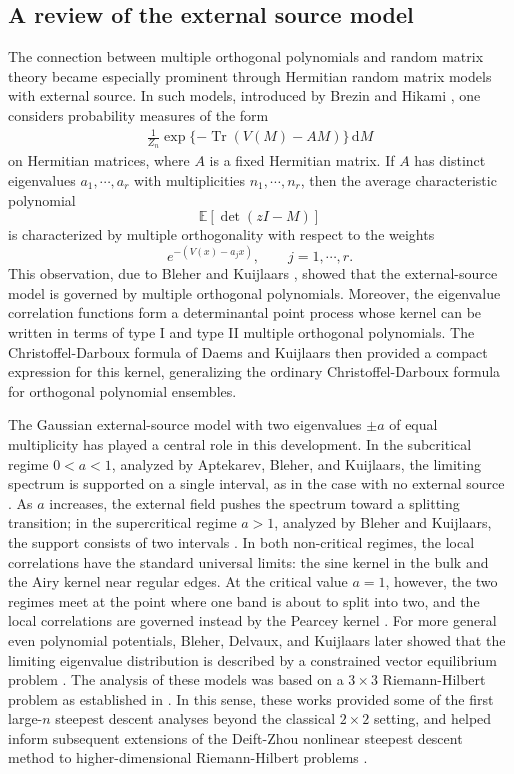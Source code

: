\documentclass[a4paper,10pt,leqno]{amsart}
\numberwithin{equation}{section}
\theoremstyle{remark}
\newcommand{\dd}{\mathrm{d}}
\begin{document}
\subsection{A review of the external source model}

The connection between multiple orthogonal polynomials and random matrix theory
became especially prominent through Hermitian random matrix models with external
source.  In such models, introduced by Brezin and Hikami \cite{BreHi1, BreHi2}, one considers probability measures of the form
\begin{align} \label{prob distribution}
    \frac{1}{Z_n}\exp\{-\operatorname{Tr}(V(M)-AM)\}\,\dd M
\end{align}
on Hermitian matrices, where $A$ is a fixed Hermitian matrix.  If $A$ has
distinct eigenvalues $a_1,\cdots,a_r$ with multiplicities
$n_1,\cdots,n_r$, then the average characteristic polynomial
\[
        \mathbb E[\det(zI-M)]
\]
is characterized by multiple orthogonality with respect to the weights
\[
        e^{-(V(x)-a_jx)}, \qquad j=1,\cdots,r.
\]
This observation, due to Bleher and Kuijlaars \cite{BK0}, showed that the
external-source model is governed by multiple orthogonal polynomials. Moreover,
the eigenvalue correlation functions form a determinantal point process whose
kernel can be written in terms of type I and type II multiple orthogonal
polynomials.  The Christoffel-Darboux formula of Daems and Kuijlaars
\cite{DaemsKuijlaars2004} then provided a compact expression for this kernel, generalizing the
ordinary Christoffel-Darboux formula for orthogonal polynomial ensembles.

The Gaussian external-source model with two eigenvalues $\pm a$ of equal
multiplicity has played a central role in this development.  In the
subcritical regime $0<a<1$, analyzed by Aptekarev, Bleher, and Kuijlaars,
the limiting spectrum is supported on a single interval, as in the case with
no external source \cite{ABK05}.  As $a$ increases, the external field pushes the spectrum
toward a splitting transition; in the supercritical regime $a>1$, analyzed by
Bleher and Kuijlaars, the support consists of two intervals
\cite{BK04b}.  In both non-critical regimes, the local correlations have
the standard universal limits: the sine kernel in the bulk and the Airy kernel
near regular edges.  At the critical value $a=1$, however, the two regimes
meet at the point where one band is about to split into two, and the local
correlations are governed instead by the Pearcey kernel \cite{BK07}.  For more general even polynomial
potentials, Bleher, Delvaux, and Kuijlaars later showed that the limiting
eigenvalue distribution is described by a constrained vector equilibrium
problem \cite{BDK11}.  The analysis of these models was based on a $3\times 3$ Riemann-Hilbert
problem as established in \cite{VanAsscheGeronimoKuijlaars2001}.  In this sense, these works provided some of the first large-$n$
steepest descent analyses beyond the classical $2\times 2$ setting, and
helped inform subsequent extensions of the Deift-Zhou nonlinear steepest
descent method to higher-dimensional Riemann-Hilbert problems
\cite{DaemsKuijlaarsVeys2008,
DuitsKuijlaars2009,KuijlaarsMartinezFinkelshteinWielonsky2009,
BertolaGekhtmanSzmigielski2013}.
\end{document}
